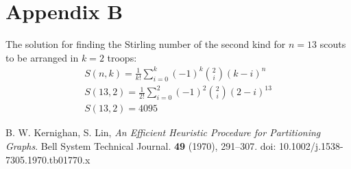 \documentclass{amsart}
\theoremstyle{definition}
\theoremstyle{remark}
\numberwithin{equation}{section}
\begin{document}
\section*{Appendix B}
The solution for finding the Stirling number of the second kind for $n = 13$ scouts to be arranged in $k = 2$ troops:
\begin{gather*}
	S(n,k) = \frac{1}{k!} \sum_{i=0}^{k}(-1)^k {2 \choose i} (k - i)^{n} \\
	S(13,2) = \frac{1}{2!} \sum_{i=0}^{2}(-1)^2 {2 \choose i} (2 - i)^{13} \\
	S(13, 2) = 4095
\end{gather*}


\begin{thebibliography}{10}

 B. W. Kernighan, S. Lin, \textit{An Efficient Heuristic Procedure for Partitioning Graphs}. Bell System Technical Journal. \textbf{49} (1970), 291--307. doi: 10.1002/j.1538-7305.1970.tb01770.x

\end{thebibliography}
\end{document}
